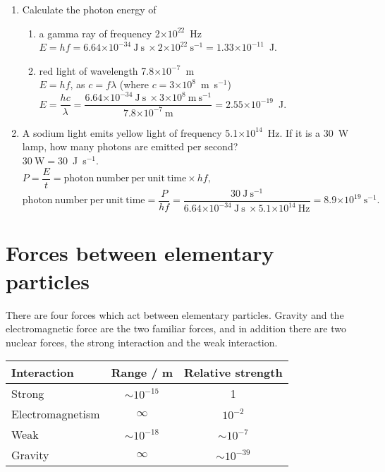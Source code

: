 \documentclass[a4paper,12pt]{article}
\providecommand{\e}[1]{\ensuremath{\times 10^{#1}}}
\begin{document}
\begin{enumerate}
\item Calculate the photon energy of
\begin{enumerate}
\item a gamma ray of frequency 2\e{22}~Hz\\
$E=hf=6.64\e{-34}~\mathrm{J~s~}\times 2\e{22}~\mathrm{s}^{-1}=1.33\e{-11}$~J.
\item red light of wavelength 7.8\e{-7}~m\\
$E=hf$, as $c=f\lambda$ (where $c=3\e{8}$~m~s$^{-1}$)\\
$E=\dfrac{hc}{\lambda}=\dfrac{6.64\e{-34}~\mathrm{J~s~}\times 3\e{8}~\mathrm{m~s}^{-1}}{7.8\e{-7}~\mathrm{m}}=2.55\e{-19}$~J.
\end{enumerate}
\item A sodium light emits yellow light of frequency 5.1\e{14}~Hz.  If it is a 30~W lamp, how many photons are emitted per second?\\
$30~\mathrm{W}=30$~J~s$^{-1}.$\\
$P=\dfrac{E}{t}=\mathrm{photon~number~per~unit~time}\times hf,$\\
$\mathrm{photon~number~per~unit~time}=\dfrac{P}{hf}=\dfrac{30~\mathrm{J}~\mathrm{s}^{-1}}{6.64\e{-34}~\mathrm{J~s~}\times 5.1\e{14}~\mathrm{Hz}}=8.9\e{19}~\mathrm{s}^{-1}.$
\end{enumerate}

\section{Forces between elementary particles}

There are four forces which act between elementary particles.  Gravity and the electromagnetic force are the two familiar forces, and in addition there are two nuclear forces, the strong interaction and the weak interaction.\\

\begin{tabular}{lcc}
\hline
Interaction & Range / m & Relative strength\\
\hline
Strong & $\sim 10^{-15}$ & 1\\
Electromagnetism & $\infty$ & $10^{-2}$\\
Weak & $\sim 10^{-18}$ & $\sim 10^{-7}$\\
Gravity & $\infty$ & $\sim 10^{-39}$\\
\hline
\end{tabular}\\
\end{document}
